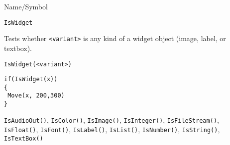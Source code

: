 \begin{desc}{Name/Symbol}
\item[Name/Symbol]	\verb+IsWidget+

\item[Description]	Tests whether \verb+<variant>+ is any kind of a widget object
		(image, label, or textbox).

\item[Usage]		
\begin{verbatim}
IsWidget(<variant>)
\end{verbatim}

\item[Example]	
\begin{verbatim}
if(IsWidget(x))
{
 Move(x, 200,300)
}
\end{verbatim}

\item[See Also] \verb+IsAudioOut()+, \verb+IsColor()+,
  \verb+IsImage()+, \verb+IsInteger()+, \verb+IsFileStream()+,
  \verb+IsFloat()+, \verb+IsFont()+, \verb+IsLabel()+,
  \verb+IsList()+, \verb+IsNumber()+, \verb+IsString()+,
  \verb+IsTextBox()+
\end{desc}

\rl




